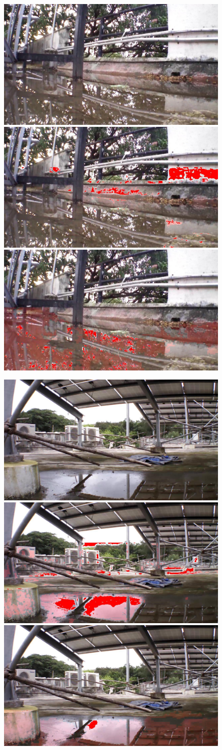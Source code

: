 \documentclass[11pt]{article}
\begin{document}
\begin{figure}
  \centering
   
  \includegraphics[width=0.32\linewidth]{stagnantWater/results/dataset_73/IMG_PAIR_124_1} \hfill
  \includegraphics[width=0.32\linewidth]{stagnantWater/results/dataset_73/output_124_jpl2} \hfill
  \includegraphics[width=0.32\linewidth]{stagnantWater/results/dataset_73/output_124}

  \includegraphics[width=0.32\linewidth]{stagnantWater/results/dataset_81/IMG_PAIR_1_1} \hfill
  \includegraphics[width=0.32\linewidth]{stagnantWater/results/dataset_81/output_1_jpl2} \hfill
  \includegraphics[width=0.32\linewidth]{stagnantWater/results/dataset_81/output_1}


\end{figure}
\end{document}
